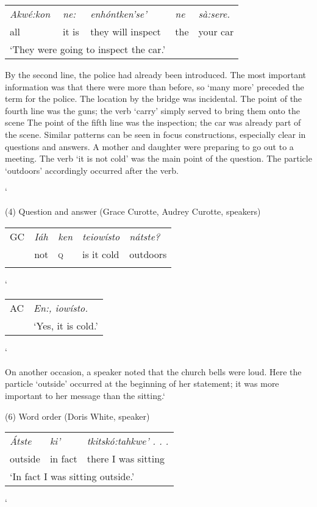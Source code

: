 \documentclass[output=paper,colorlinks,citecolor=brown
]{langscibook}
\begin{document}
\begin{tabular}{lllll}
\emph{Akwé:kon} & \emph{ne:} & \emph{enhóntken'se'} & \emph{ne} &\emph{sà:sere.}\\

all&it is& they will inspect&the&your car\\
\multicolumn{3}{l}{`They were going to inspect the car.'}
\end{tabular}\bigskip

By the second line, the police had already been introduced. The most important information was that there were more than before, so `many more' preceded the term for the police. The location by the bridge was incidental. The point of the fourth line was the guns; the verb `carry' simply served to bring them onto the scene The point of the fifth line was the inspection; the car was already part of the scene. 
Similar patterns can be seen in focus constructions, especially clear in questions and answers. A mother and daughter were preparing to go out to a meeting. The verb `it is not cold' was the main point of the question. The particle `outdoors' accordingly occurred after the verb.

\bigskip` 

(4) Question and answer (Grace Curotte, Audrey Curotte, speakers)\\

\begin{tabular}{lllll}
GC & \emph{Iáh} & \emph{ken} & \emph{teiowísto} & \emph{nátste?}\\

& not & \textsc{q} & is it cold & outdoors\\
\multicolumn{4}{l}{}
`Isn\textquotesingle t it cold outside?'
\end{tabular}

\bigskip`
\begin{tabular}{ll}
AC &   \emph{En:, iowísto.}\\
& \multicolumn{1}{l}{`Yes, it is cold.'}


\end{tabular}\bigskip`

On another occasion, a speaker noted that the church bells were loud. Here the particle `outside' occurred at the beginning of her statement; it was more important to her message than the sitting.\bigskip`

(6) Word order (Doris White, speaker)\\
\begin{tabular}{lll}
\emph{Átste} & \emph{ki'} & \emph{tkitskó:tahkwe' . . .}\\

outside & in fact & there I was sitting\\
\multicolumn{3}{l}{`In fact I was sitting outside.'}

\end{tabular}\bigskip`
\end{document}
